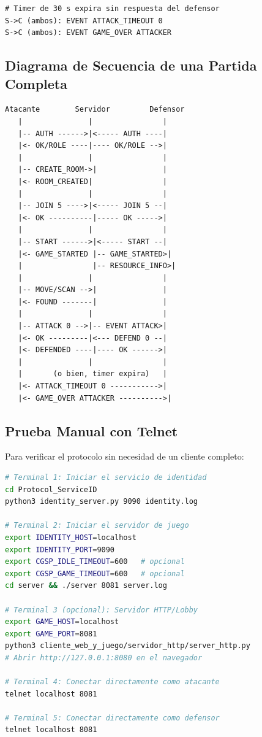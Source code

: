 \documentclass[12pt, letterpaper]{article}
\begin{document}
\begin{lstlisting}
# Timer de 30 s expira sin respuesta del defensor
S->C (ambos): EVENT ATTACK_TIMEOUT 0
S->C (ambos): EVENT GAME_OVER ATTACKER
\end{lstlisting}

\subsection{Diagrama de Secuencia de una Partida Completa}

\begin{lstlisting}
Atacante        Servidor         Defensor
   |               |                |
   |-- AUTH ------>|<----- AUTH ----|
   |<- OK/ROLE ----|---- OK/ROLE -->|
   |               |                |
   |-- CREATE_ROOM->|               |
   |<- ROOM_CREATED|                |
   |               |                |
   |-- JOIN 5 ---->|<----- JOIN 5 --|
   |<- OK ----------|----- OK ----->|
   |               |                |
   |-- START ------>|<----- START --|
   |<- GAME_STARTED |-- GAME_STARTED>|
   |                |-- RESOURCE_INFO>|
   |               |                |
   |-- MOVE/SCAN -->|               |
   |<- FOUND -------|               |
   |               |                |
   |-- ATTACK 0 -->|-- EVENT ATTACK>|
   |<- OK ---------|<--- DEFEND 0 --|
   |<- DEFENDED ----|---- OK ------>|
   |               |                |
   |       (o bien, timer expira)   |
   |<- ATTACK_TIMEOUT 0 ----------->|
   |<- GAME_OVER ATTACKER ---------->|
\end{lstlisting}

\subsection{Prueba Manual con Telnet}

Para verificar el protocolo sin necesidad de un cliente completo:

\begin{lstlisting}[language=bash]
# Terminal 1: Iniciar el servicio de identidad
cd Protocol_ServiceID
python3 identity_server.py 9090 identity.log

# Terminal 2: Iniciar el servidor de juego
export IDENTITY_HOST=localhost
export IDENTITY_PORT=9090
export CGSP_IDLE_TIMEOUT=600   # opcional
export CGSP_GAME_TIMEOUT=600   # opcional
cd server && ./server 8081 server.log

# Terminal 3 (opcional): Servidor HTTP/Lobby
export GAME_HOST=localhost
export GAME_PORT=8081
python3 cliente_web_y_juego/servidor_http/server_http.py
# Abrir http://127.0.0.1:8080 en el navegador

# Terminal 4: Conectar directamente como atacante
telnet localhost 8081

# Terminal 5: Conectar directamente como defensor
telnet localhost 8081
\end{lstlisting}
\end{document}
